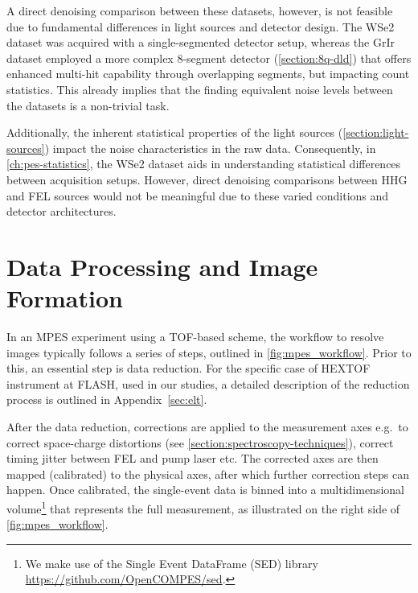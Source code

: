 A direct denoising comparison between these datasets, however, is not feasible due to fundamental differences in light sources and detector design. The \gls{WSe2} dataset was acquired with a single-segmented detector setup, whereas the \gls{GrIr} dataset employed a more complex 8-segment detector (\cref{section:8q-dld}) that offers enhanced multi-hit capability through overlapping segments, but impacting count statistics. This already implies that the finding equivalent noise levels between the datasets is a non-trivial task.

Additionally, the inherent statistical properties of the light sources (\cref{section:light-sources}) impact the noise characteristics in the raw data. Consequently, in \cref{ch:pes-statistics}, the \gls{WSe2} dataset aids in understanding statistical differences between acquisition setups. However, direct denoising comparisons between \gls{HHG} and \gls{FEL} sources would not be meaningful due to these varied conditions and detector architectures.

\section{Data Processing and Image Formation}\label{sec:image-formation}

In an \gls{MPES} experiment using a \gls{TOF}-based scheme, the workflow to resolve images typically follows a series of steps, outlined in \cref{fig:mpes_workflow}. Prior to this, an essential step is data reduction. For the specific case of \gls{HEXTOF} instrument at \gls{FLASH}, used in our studies, a detailed description of the reduction process is outlined in Appendix~\ref{sec:elt}.

After the data reduction, corrections are applied to the measurement axes  e.g.\ to correct space-charge distortions (see \cref{section:spectroscopy-techniques}), correct timing jitter between \gls{FEL} and pump laser etc. The corrected axes are then mapped (calibrated) to the physical axes, after which further correction steps can happen. Once calibrated, the single-event data is binned into a multidimensional volume\footnote{We make use of the Single Event DataFrame (SED) library \href{https://github.com/OpenCOMPES/sed}{https://github.com/OpenCOMPES/sed}.} that represents the full measurement, as illustrated on the right side of \cref{fig:mpes_workflow}.

